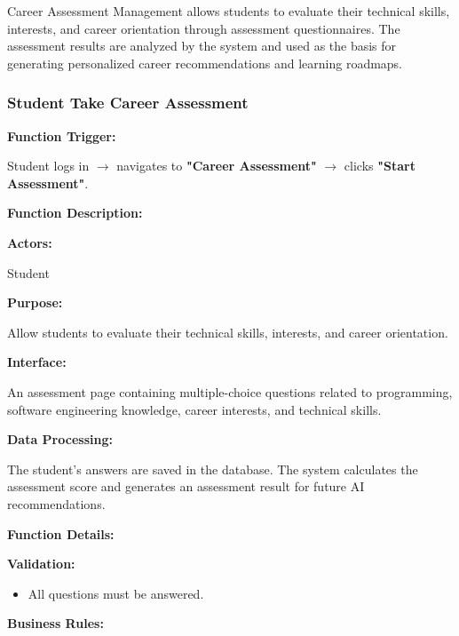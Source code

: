 Career Assessment Management allows students to evaluate their technical skills, interests, and career orientation through assessment questionnaires. The assessment results are analyzed by the system and used as the basis for generating personalized career recommendations and learning roadmaps.
\subsubsection{Student Take Career Assessment}

\textbf{Function Trigger:}

Student logs in $\rightarrow$ navigates to \textbf{"Career Assessment"} $\rightarrow$ clicks \textbf{"Start Assessment"}.

\vspace{0.3cm}

\textbf{Function Description:}

\textbf{Actors:}

Student

\vspace{0.2cm}

\textbf{Purpose:}

Allow students to evaluate their technical skills, interests, and career orientation.

\vspace{0.2cm}

\textbf{Interface:}

An assessment page containing multiple-choice questions related to programming, software engineering knowledge, career interests, and technical skills.

\vspace{0.2cm}

\textbf{Data Processing:}

The student's answers are saved in the database. The system calculates the assessment score and generates an assessment result for future AI recommendations.

\vspace{0.3cm}

\textbf{Function Details:}

\textbf{Validation:}

\begin{itemize}
\item All questions must be answered.
\end{itemize}

\textbf{Business Rules:}

